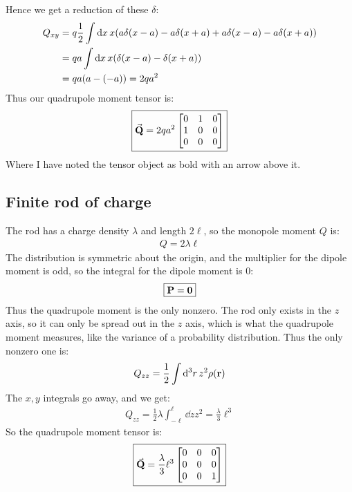 \documentclass[12pt]{article}
\begin{document}
Hence we get a reduction of these $\delta$:
\begin{align*}
  Q_{xy}&=q\frac12\int\dd{x}x
  \qty(a\delta(x-a)-a\delta(x+a)+a\delta(x-a)-a\delta(x+a))\\
  &=qa\int\dd{x}x\qty(\delta(x-a)-\delta(x+a))\\
  &=qa\qty(a-(-a))=2qa^2
\end{align*}
Thus our quadrupole moment tensor is:
\begin{align}
  \boxed{
    \va{\vb{Q}}=2qa^2
    \begin{bmatrix}
      0 & 1 & 0 \\ 1 & 0 & 0 \\ 0 & 0 & 0
    \end{bmatrix}
  }
\end{align}
Where I have noted the tensor object as bold with an arrow above it.
\subsection{Finite rod of charge}
The rod has a charge density $\lambda$ and length $2\ell$, so the monopole moment $Q$ is:
\begin{align*}
  \boxed{Q=2\lambda\ell}
\end{align*}
The distribution is symmetric about the origin, and the multiplier for the dipole moment is odd, so the integral for the dipole moment is $0$:
\begin{align}
  \boxed{\vb{P}=\bm{0}}
\end{align}
Thus the quadrupole moment is the only nonzero. The rod only exists in the $z$ axis, so it can only be spread out in the $z$ axis, which is what the quadrupole moment measures, like the variance of a probability distribution. Thus the only nonzero one is:
\begin{align*}
  Q_{zz}=\frac12\int\dd[3]{r}z^2\rho(\vb{r})
\end{align*}
The $x,y$ integrals go away, and we get:
\begin{align*}
  Q_{zz}=\frac12\lambda\int_{-\ell}^\ell\dd{z}z^2=\frac\lambda3\ell^3
\end{align*}
So the quadrupole moment tensor is:
\begin{align}
  \boxed{
    \va{\vb{Q}}=\frac\lambda3\ell^3
    \begin{bmatrix}
      0 & 0 & 0 \\ 0 & 0 & 0 \\ 0 & 0 & 1
    \end{bmatrix}
  }
\end{align}
\end{document}
